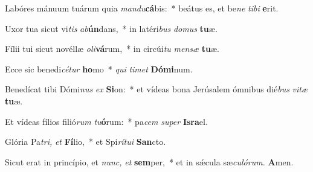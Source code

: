 \item Labóres mánuum tuárum quia \textit{mandu}\textbf{cá}bis:~* beátus es, et be\textit{ne} \textit{tibi} \textbf{e}rit.
\item Uxor tua sicut vi\textit{tis} \textit{ab}\textbf{ún}dans,~* in latéri\textit{bus} \textit{domus} \textbf{tu}æ.
\item Fílii tui sicut novéllæ \textit{oli}\textbf{vá}rum,~* in circúi\hspace{0.03em}\textit{tu} \textit{mensæ} \textbf{tu}æ.
\item Ecce sic benedi\hspace{0.03em}\textit{cétur} \textbf{ho}mo~* \textit{qui} \textit{timet} \textbf{Dómi}num.
\item Benedícat tibi Dómi\textit{nus} \textit{ex} \textbf{Si}on:~* et vídeas bona Jerúsalem ómnibus dié\textit{bus} \textit{vitæ} \textbf{tu}æ.
\item Et vídeas fílios filió\textit{rum} \textit{tu}\textbf{ó}rum:~* pa\hspace{0.03em}\textit{cem} \textit{super} \textbf{Isra}el.
\item Glória Pa\hspace{0.03em}\textit{tri,} \textit{et} \textbf{Fí}lio,~* et Spi\textit{rítui} \textbf{San}cto.
\item Sicut erat in princípio, et \textit{nunc,} \textit{et} \textbf{sem}per,~* et in sǽcula sæ\textit{culórum.} \textbf{A}men.
